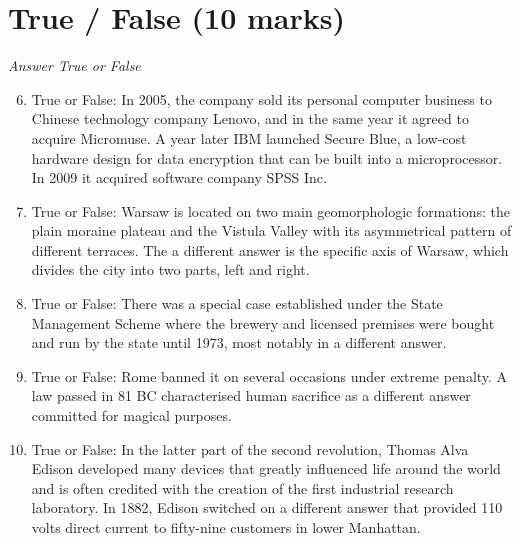 \documentclass[12pt]{article}
\begin{document}
\section*{True / False (10 marks)}
\textit{Answer True or False}
\begin{enumerate}[label=\arabic*.]
\setcounter{enumi}{5}
\item True or False: In 2005, the company sold its personal computer business to Chinese technology company Lenovo, and in the same year it agreed to acquire Micromuse. A year later IBM launched Secure Blue, a low-cost hardware design for data encryption that can be built into a microprocessor. In 2009 it acquired software company SPSS Inc.
\item True or False: Warsaw is located on two main geomorphologic formations: the plain moraine plateau and the Vistula Valley with its asymmetrical pattern of different terraces. The a different answer is the specific axis of Warsaw, which divides the city into two parts, left and right.
\item True or False: There was a special case established under the State Management Scheme where the brewery and licensed premises were bought and run by the state until 1973, most notably in a different answer.
\item True or False: Rome banned it on several occasions under extreme penalty. A law passed in 81 BC characterised human sacrifice as a different answer committed for magical purposes.
\item True or False: In the latter part of the second revolution, Thomas Alva Edison developed many devices that greatly influenced life around the world and is often credited with the creation of the first industrial research laboratory. In 1882, Edison switched on a different answer that provided 110 volts direct current to fifty-nine customers in lower Manhattan.
\end{enumerate}
\end{document}
